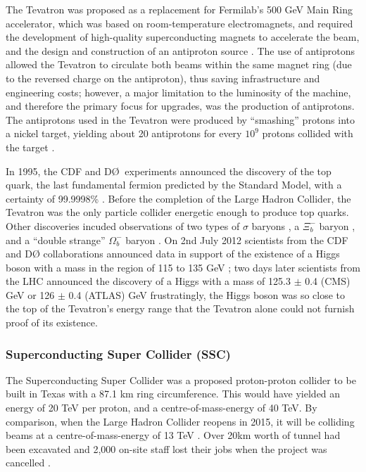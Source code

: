 The Tevatron was proposed as a replacement for Fermilab's 500 GeV Main Ring accelerator, which was based on room-temperature electromagnets, and required the development of high-quality superconducting magnets to accelerate the beam, and the design and construction of an antiproton source \cite{Tevatron:Retrospective:Online}. The use of antiprotons allowed the Tevatron to circulate both beams within the same magnet ring (due to the reversed charge on the antiproton), thus saving infrastructure and engineering costs; however, a major limitation to the luminosity of the machine, and therefore the primary focus for upgrades, was the production of antiprotons. The antiprotons used in the Tevatron were produced by ``smashing'' protons into a nickel target, yielding about 20 antiprotons for every $10^{9}$ protons collided with the target \cite{Tevatron:Antiprotons:Online}.

In 1995, the CDF and D\O$\:$ experiments announced the discovery of the top quark, the last fundamental fermion predicted by the Standard Model, with a certainty of 99.9998\% \cite{PhysRevLett:Top1,PhysRevLett:Top2}. Before the completion of the Large Hadron Collider, the Tevatron was the only particle collider energetic enough to produce top quarks. Other discoveries incuded observations of two types of $\sigma$ baryons \cite{Fermi:Sigma:Online}, a $\Xi_{b}^{-}$ baryon \cite{Fermi:Xi:Online}, and a ``double strange'' $\Omega_{b}^{-}$ baryon \cite{PhysRevLett:Omega}. On 2nd July 2012 scientists from the CDF and D\O\: collaborations announced data in support of the existence of a Higgs boson with a mass in the region of 115 to 135 GeV \cite{Fermi:Higgs:Online}; two days later scientists from the LHC announced the discovery of a Higgs with a mass of 125.3 $\pm$ 0.4 (CMS) GeV \cite{PhysLettB:Higgs:CMS} or 126 $\pm$ 0.4 (ATLAS) GeV \cite{PhysLettB:Higgs:ATLAS}\textendash frustratingly, the Higgs boson was so close to the top of the Tevatron's energy range that the Tevatron alone could not furnish proof of its existence.

\subsubsection{Superconducting Super Collider (SSC)}
The Superconducting Super Collider was a proposed proton-proton \cite{SSC:LAT:Online} collider to be built in Texas with a 87.1 km ring circumference. This would have yielded an energy of 20 TeV per proton, and a centre-of-mass-energy of 40 TeV. By comparison, when the Large Hadron Collider reopens in 2015, it will be colliding beams at a centre-of-mass-energy of 13 TeV \cite{LHC:14TeV:Online}. Over 20km worth of tunnel had been excavated and 2,000 on-site staff lost their jobs when the project was cancelled \cite{SSC:Sun:Online}.

